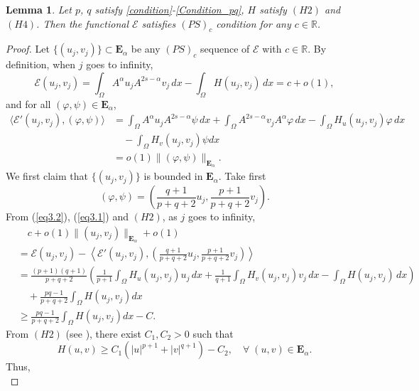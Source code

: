 \documentclass[10pt]{article}
\numberwithin{equation}{section}
\newtheorem{lemma}[theorem]{Lemma}
\numberwithin{equation}{section}
\begin{document}
\begin{lemma}\label{2211161003}
Let $p$, $q$ satisfy \eqref{condition}-\eqref{Condition_pq}, ${H}$ satisfy $(H2)$ and $(H4)$. Then the functional $\mathcal{E}$ satisfies $(PS)_c$ condition for any $c\in \mathbb{R}$.
\end{lemma}
\begin{proof}
Let $\{(u_j, v_j)\}\subset \mathbf{E}_{\alpha}$ be any $(PS)_c$ sequence of $\mathcal{E}$ with $c\in\mathbb{R}$. By definition, when $j$ goes to infinity,
 \begin{equation}\label{eq3.1}
\mathcal{E}(u_j,v_j)=\int_{\Omega}A^{\alpha}u_jA^{2s-\alpha}v_j\, dx-\int_{\Omega}H(u_j, v_j)\, dx=c+o(1),
 \end{equation}
 and for all $(\varphi, \psi)\in \mathbf{E}_{\alpha}$,
\begin{equation}\label{eq3.2}
\begin{aligned}
\langle \mathcal{E}'(u_j, v_j), (\varphi, \psi)\rangle& =\int_{\Omega}A^{\alpha}u_jA^{2s-\alpha}\psi \, dx+\int_{\Omega}A^{2s-\alpha}v_jA^{\alpha}\varphi\, dx-\int_{\Omega}H_u(u_j, v_j) \varphi\, dx\\
&\quad -\int_{\Omega}H_v(u_j, v_j) \psi dx\\
& =o(1)\lVert (\varphi, \psi) \lVert_{\mathbf{E}_{\alpha}}.
\end{aligned}
\end{equation}
We first claim that $\{(u_j, v_j)\}$ is bounded in $\mathbf{E}_{\alpha}$. Take first
$$(\varphi, \psi)=\left(\frac{q+1}{p+q+2}u_j, \frac{p+1}{p+q+2}v_j\right).$$
From (\ref{eq3.2}), (\ref{eq3.1}) and $(H2)$, as $j$ goes to infinity,
\[
\begin{split}
& \quad c+o(1)\|(u_j, v_j)\|_{\mathbf{E}_{\alpha}}+o(1)\\
& = \mathcal{E}(u_j,v_j)-\left\langle \mathcal{E}'(u_j, v_j), \left(\frac{q+1}{p+q+2}u_j, \frac{p+1}{p+q+2}v_j\right)\right\rangle\\
& = \frac{(p+1)(q+1)}{p+q+2}\left(\frac{1}{p+1}\int_{\Omega} H_u(u_j, v_j) u_j\, dx+ \frac{1}{q+1}\int_{\Omega}H_v(u_j, v_j) v_j\, dx-\int_{\Omega}H(u_j, v_j)\, dx\right)\\
&\quad + \frac{pq-1}{p+q+2}\int_{\Omega}H(u_j, v_j)dx\\
&\ge \frac{pq-1}{p+q+2}\int_{\Omega}H(u_j, v_j)dx -C.
\end{split}
\]
From $(H2)$ (see \cite[Lemma 1.1]{Felmer1993}), there exist $C_1, C_2>0$ such that
\[
H(u,v)\ge C_1(|u|^{p+1}+|v|^{q+1})-C_2, \quad \forall\; (u, v)\in \mathbf{E}_{\alpha}.
\]
Thus,
\begin{equation}\label{2210101503}

\end{equation}
\end{proof}
\end{document}
